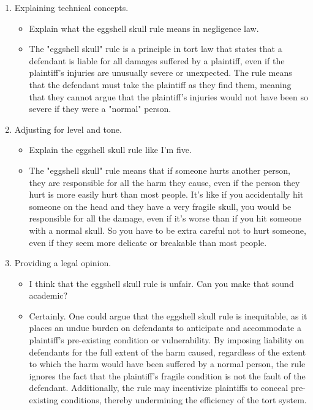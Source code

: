 \begin{enumerate}
  \item Explaining technical concepts. 
  \begin{itemize}
    \item[Q:] Explain what the eggshell skull rule means in negligence law. 
    \item[A:] The "eggshell skull" rule is a principle in tort law that states that a defendant is liable for all damages suffered by a plaintiff, even if the plaintiff's injuries are unusually severe or unexpected. The rule means that the defendant must take the plaintiff as they find them, meaning that they cannot argue that the plaintiff's injuries would not have been so severe if they were a "normal" person.
  \end{itemize}
  \item Adjusting for level and tone. 
  \begin{itemize}
    \item[Q:] Explain the eggshell skull rule like I'm five.
    \item[A:] The "eggshell skull" rule means that if someone hurts another person, they are responsible for all the harm they cause, even if the person they hurt is more easily hurt than most people. It's like if you accidentally hit someone on the head and they have a very fragile skull, you would be responsible for all the damage, even if it's worse than if you hit someone with a normal skull. So you have to be extra careful not to hurt someone, even if they seem more delicate or breakable than most people.
  \end{itemize}
  \item Providing a legal opinion. 
  \begin{itemize}
    \item[Q:] I think that the eggshell skull rule is unfair. Can you make that sound academic?
    \item[A:] Certainly. One could argue that the eggshell skull rule is inequitable, as it places an undue burden on defendants to anticipate and accommodate a plaintiff's pre-existing condition or vulnerability. By imposing liability on defendants for the full extent of the harm caused, regardless of the extent to which the harm would have been suffered by a normal person, the rule ignores the fact that the plaintiff's fragile condition is not the fault of the defendant. Additionally, the rule may incentivize plaintiffs to conceal pre-existing conditions, thereby undermining the efficiency of the tort system.
  \end{itemize} 
\end{enumerate}

